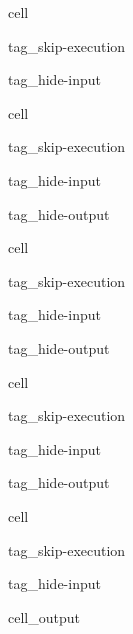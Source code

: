 \documentclass[letterpaper,10pt,english,openany,oneside]{jupyterBook}
\begin{document}
\begin{sphinxuseclass}{cell}
\begin{sphinxuseclass}{tag_skip-execution}
\begin{sphinxuseclass}{tag_hide-input}
\end{sphinxuseclass}
\end{sphinxuseclass}
\end{sphinxuseclass}
\begin{sphinxuseclass}{cell}
\begin{sphinxuseclass}{tag_skip-execution}
\begin{sphinxuseclass}{tag_hide-input}
\begin{sphinxuseclass}{tag_hide-output}
\end{sphinxuseclass}
\end{sphinxuseclass}
\end{sphinxuseclass}
\end{sphinxuseclass}
\begin{sphinxuseclass}{cell}
\begin{sphinxuseclass}{tag_skip-execution}
\begin{sphinxuseclass}{tag_hide-input}
\begin{sphinxuseclass}{tag_hide-output}
\end{sphinxuseclass}
\end{sphinxuseclass}
\end{sphinxuseclass}
\end{sphinxuseclass}
\begin{sphinxuseclass}{cell}
\begin{sphinxuseclass}{tag_skip-execution}
\begin{sphinxuseclass}{tag_hide-input}
\begin{sphinxuseclass}{tag_hide-output}
\end{sphinxuseclass}
\end{sphinxuseclass}
\end{sphinxuseclass}
\end{sphinxuseclass}
\begin{sphinxuseclass}{cell}
\begin{sphinxuseclass}{tag_skip-execution}
\begin{sphinxuseclass}{tag_hide-input}\begin{sphinxVerbatimOutput}

\begin{sphinxuseclass}{cell_output}
\noindent{}

\end{sphinxuseclass}\end{sphinxVerbatimOutput}

\end{sphinxuseclass}
\end{sphinxuseclass}
\end{sphinxuseclass}
\sphinxstepscope
\end{document}
